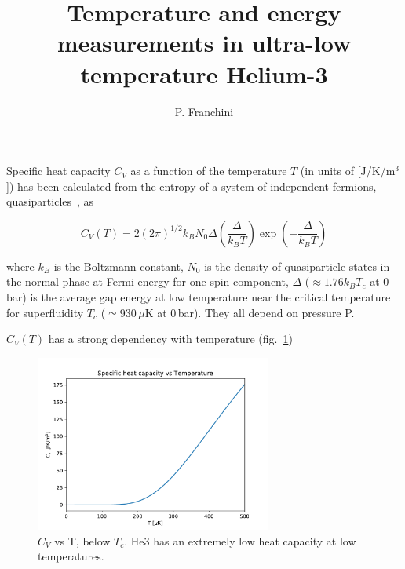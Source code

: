 \documentclass[a4paper,12pt]{article}
\title{Temperature and energy measurements in ultra-low temperature Helium-3}
\author{P. Franchini}
\begin{document}
\maketitle



Specific heat capacity $C_V$ as a function of the temperature $T$ (in units of [J/K/m$^3$]) has been calculated from the entropy of a system of independent fermions, quasiparticles~\cite{vollhardt}, as

\begin{equation}
C_V(T)=2(2\pi)^{1/2}k_BN_0\varDelta\left(\frac{\varDelta}{k_BT}\right)\exp\left(-\frac{\varDelta}{k_BT}\right)
\end{equation}

where $k_B$ is the Boltzmann constant, $N_0$ is the density of quasiparticle states in the normal phase at Fermi energy for one spin component, $\varDelta$ ($\approx 1.76 k_B T_c$ at 0\,bar) is the average gap energy at low temperature near the critical temperature for superfluidity $T_c$ ($\simeq$930\,$\mu$K at 0\,bar). They all depend on pressure P.

$C_V(T)$ has a strong dependency with temperature (fig.~\ref{fig:CvT})

\begin{figure}[htb]
  \begin{center}
    \includegraphics[width=0.69\textwidth]{Cv_vs_T-zoom}
  \end{center}
  \caption{$C_V$ vs T, below $T_c$. He3 has an extremely low heat capacity at low temperatures.}
  \label{fig:CvT}
\end{figure}
\end{document}
